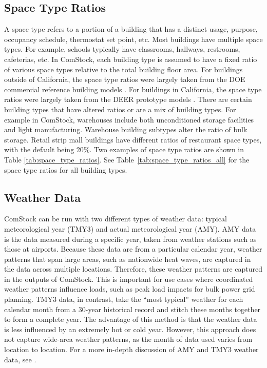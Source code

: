 \subsection{Space Type Ratios}
\label{sec:space_type_ratios}
A space type refers to a portion of a building that has a distinct usage, purpose, occupancy schedule, thermostat set point, etc. Most buildings have multiple space types. For example, schools typically have classrooms, hallways, restrooms, cafeterias, etc. In ComStock, each building type is assumed to have a fixed ratio of various space types relative to the total building floor area. For buildings outside of California, the space type ratios were largely taken from the DOE commercial reference building models \citep{deru_2011}. For buildings in California, the space type ratios were largely taken from the DEER prototype models \citep{cpuc_deer}. There are certain building types that have altered ratios or are a mix of building types. For example in ComStock, warehouses include both unconditioned storage facilities and light manufacturing. Warehouse building subtypes alter the ratio of bulk storage. Retail strip mall buildings have different ratios of restaurant space types, with the default being 20\%. Two examples of space type ratios are shown in Table \ref{tab:space_type_ratios}. See Table~\ref{tab:space_type_ratios_all} for the space type ratios for all building types.



\subsection{Weather Data}
ComStock can be run with two different types of weather data: typical meteorological year (TMY3) and actual meteorological year (AMY). AMY data is the data measured during a specific year, taken from weather stations such as those at airports. Because these data are from a particular calendar year, weather patterns that span large areas, such as nationwide heat waves, are captured in the data across multiple locations. Therefore, these weather patterns are captured in the outputs of ComStock. This is important for use cases where coordinated weather patterns influence loads, such as peak load impacts for bulk power grid planning. TMY3 data, in contrast, take the ``most typical'' weather for each calendar month from a 30-year historical record and stitch these months together to form a complete year. The advantage of this method is that the weather data is less influenced by an extremely hot or cold year. However, this approach does not capture wide-area weather patterns, as the month of data used varies from location to location. For a more in-depth discussion of AMY and TMY3 weather data, see \cite{eulp_final_report}.

